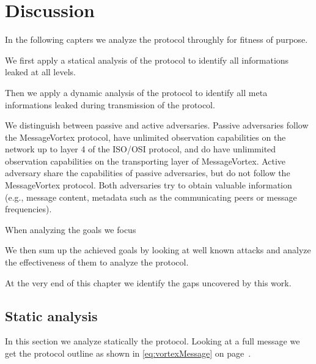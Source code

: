 
\part{Discussion \label{sec:discussion}}

In the following capters we analyze the protocol throughly for fitness of purpose. 

We first apply a statical analysis of the protocol to identify all informations leaked at all levels.

Then we apply a dynamic analysis of the protocol to identify all meta informations leaked during transmission of the protocol.

We distinguish between passive and active adversaries. Passive adversaries follow the MessageVortex protocol, have unlimited observation capabilities on the network up to layer 4 of the ISO/OSI protocol, and do have unlimmited observation capabilities on the transporting layer of MessageVortex. Active adversary share the capabilities of passive adversaries, but do not follow the MessageVortex protocol. Both adversaries try to obtain valuable information (e.g., message content, metadata such as the communicating peers or message frequencies).

When analyzing the goals we focus 

We then sum up the achieved goals by looking at well known attacks and analyze the effectiveness of them to analyze the protocol.

At the very end of this chapter we identify the gaps uncovered by this work.

\chapter{Static analysis}
In this section we analyze statically the protocol. Looking at a full message we get the protocol outline as shown in \eqref{eq:vortexMessage} on page~\pageref{eq:vortexMessage}.

